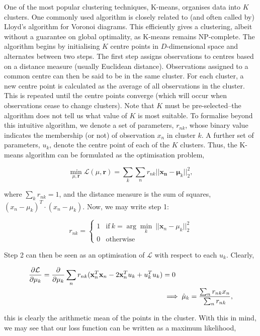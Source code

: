 \documentclass[11pt]{amsart}
\begin{document}
One of the most popular clustering techniques, K-means, organises data into $K$ clusters. One commonly used algorithm is closely related to (and often called by) Lloyd's algorithm for Voronoi diagrams. This efficiently gives a clustering, albeit without a guarantee on global optimality, as K-means remains NP-complete. The algorithm begins by initialising $K$ centre points in $D$-dimensional space and alternates between two steps. The first step assigns observations to centres based on a distance measure (usually Euclidean distance). Observations assigned to a common centre can then be said to be in the same cluster. For each cluster, a new centre point is calculated as the average of all observations in the cluster. This is repeated until the centre points converge (which will occur when observations cease to change clusters). Note that $K$ must be pre-selected--the algorithm does not tell us what value of $K$ is most suitable. To formalise beyond this intuitive algorithm, we denote a set of parameters, $r_{nk}$, whose binary value indicates the membership (or not) of observation $x_n$ in cluster $k$. A further set of parameters, $u_k$, denote the centre point of each of the $K$ clusters. Thus, the K-means algorithm can be formulated as the optimisation problem,

$$\min_{\mu, \mathbf{r}} \mathcal{L}(\mu, \mathbf{r}) = \sum_k\sum_n r_{nk}||\mathbf{x_n} - \mathbf{\mu}_k||^2_2,$$

where $\sum_k r_{nk} = 1$, and the distance measure is the sum of squares, $(x_n - \mu_k)^T\cdot(x_n - \mu_k)$. Now, we may write step 1:

\[r_{nk} = \begin{cases}
    1 & \text{if} \ k = \arg \min_k \ ||\mathbf{x}_n - \mu_k||_2^2 \\
    0 & \text{otherwise}
\end{cases}\]

Step 2 can then be seen as an optimisation of $\mathcal{L}$ with respect to each $u_k$. Clearly,

\begin{align}\frac{\partial\mathcal{L}}{\partial\mu_k} = \frac{\partial}{\partial\mu_k}\sum_n r_{nk} (\mathbf{x}_n^T\mathbf{x}_n - 2\mathbf{x}_n^Tu_k + u_k^Tu_k) &= 0 \notag \\
&\implies \hat{\mu}_k = \frac{\sum_nr_{nk}x_n}{\sum_nr_{nk}}, \notag
\end{align}

this is clearly the arithmetic mean of the points in the cluster. With this in mind, we may see that our loss function can be written as a maximum likelihood,
\end{document}
